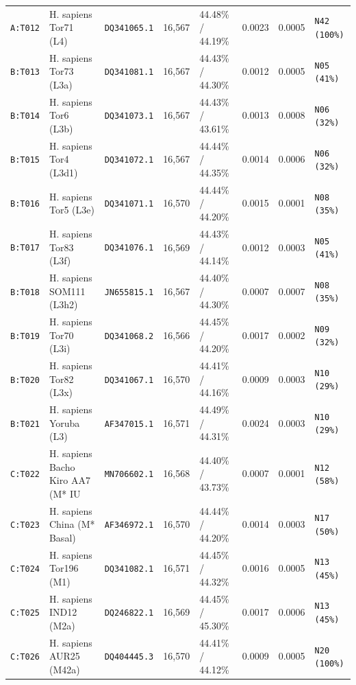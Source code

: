 \documentclass[10pt,letterpaper]{article}
\begin{document}
\begin{longtable}{llllllll}
\texttt{A:T012} & H. sapiens Tor71 (L4) & \texttt{DQ341065.1} & 16,567 & 44.48\% / 44.19\% & 0.0023 & 0.0005 & \texttt{N42 (100\%)} \\
\texttt{B:T013} & H. sapiens Tor73 (L3a) & \texttt{DQ341081.1} & 16,567 & 44.43\% / 44.30\% & 0.0012 & 0.0005 & \texttt{N05 (41\%)} \\
\texttt{B:T014} & H. sapiens Tor6 (L3b) & \texttt{DQ341073.1} & 16,567 & 44.43\% / 43.61\% & 0.0013 & 0.0008 & \texttt{N06 (32\%)} \\
\texttt{B:T015} & H. sapiens Tor4 (L3d1) & \texttt{DQ341072.1} & 16,567 & 44.44\% / 44.35\% & 0.0014 & 0.0006 & \texttt{N06 (32\%)} \\
\texttt{B:T016} & H. sapiens Tor5 (L3e) & \texttt{DQ341071.1} & 16,570 & 44.44\% / 44.20\% & 0.0015 & 0.0001 & \texttt{N08 (35\%)} \\
\texttt{B:T017} & H. sapiens Tor83 (L3f) & \texttt{DQ341076.1} & 16,569 & 44.43\% / 44.14\% & 0.0012 & 0.0003 & \texttt{N05 (41\%)} \\
\texttt{B:T018} & H. sapiens SOM111 (L3h2) & \texttt{JN655815.1} & 16,567 & 44.40\% / 44.30\% & 0.0007 & 0.0007 & \texttt{N08 (35\%)} \\
\texttt{B:T019} & H. sapiens Tor70 (L3i) & \texttt{DQ341068.2} & 16,566 & 44.45\% / 44.20\% & 0.0017 & 0.0002 & \texttt{N09 (32\%)} \\
\texttt{B:T020} & H. sapiens Tor82 (L3x) & \texttt{DQ341067.1} & 16,570 & 44.41\% / 44.16\% & 0.0009 & 0.0003 & \texttt{N10 (29\%)} \\
\texttt{B:T021} & H. sapiens Yoruba (L3) & \texttt{AF347015.1} & 16,571 & 44.49\% / 44.31\% & 0.0024 & 0.0003 & \texttt{N10 (29\%)} \\
\texttt{C:T022} & H. sapiens Bacho Kiro AA7 (M* IU & \texttt{MN706602.1} & 16,568 & 44.40\% / 43.73\% & 0.0007 & 0.0001 & \texttt{N12 (58\%)} \\
\texttt{C:T023} & H. sapiens China (M* Basal) & \texttt{AF346972.1} & 16,570 & 44.44\% / 44.20\% & 0.0014 & 0.0003 & \texttt{N17 (50\%)} \\
\texttt{C:T024} & H. sapiens Tor196 (M1) & \texttt{DQ341082.1} & 16,571 & 44.45\% / 44.32\% & 0.0016 & 0.0005 & \texttt{N13 (45\%)} \\
\texttt{C:T025} & H. sapiens IND12 (M2a) & \texttt{DQ246822.1} & 16,569 & 44.45\% / 45.30\% & 0.0017 & 0.0006 & \texttt{N13 (45\%)} \\
\texttt{C:T026} & H. sapiens AUR25 (M42a) & \texttt{DQ404445.3} & 16,570 & 44.41\% / 44.12\% & 0.0009 & 0.0005 & \texttt{N20 (100\%)} \\

\end{longtable}
\end{document}
